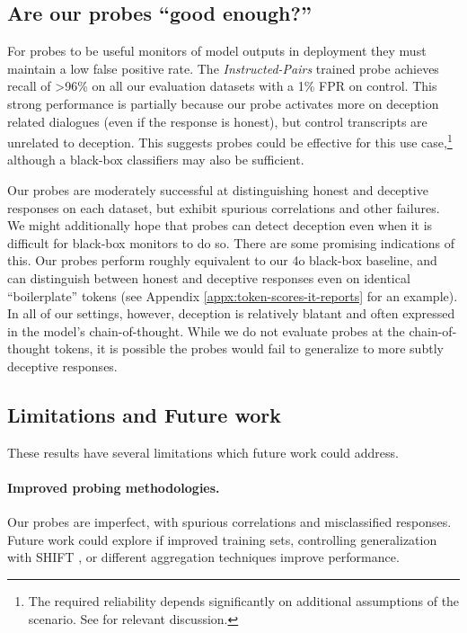 \documentclass{article}
\begin{document}
\subsection{Are our probes \enquote{good enough?}}\label{distinguishing-probe-use-cases}


For probes to be useful monitors of model outputs in deployment they must maintain a low false positive rate. The \textit{Instructed-Pairs} trained probe achieves recall of \textgreater96\%  on all our evaluation datasets with a 1\% FPR on control. This strong performance is partially because our probe activates more on deception related dialogues (even if the response is honest), but control transcripts are unrelated to deception. This suggests probes could be effective for this use case,\footnote{The required reliability depends significantly on additional assumptions of the scenario. See \citet{shlegeris2024_protocols} for relevant discussion.} although a black-box classifiers may also be sufficient.

Our probes are moderately successful at distinguishing honest and deceptive responses on each dataset, but exhibit spurious correlations and other failures.
We might additionally hope that probes can detect deception even when it is difficult for black-box monitors to do so. There are some promising indications of this. 
Our probes perform roughly equivalent to our 4o black-box baseline, and can distinguish between honest and deceptive responses even on identical \enquote{boilerplate} tokens (see Appendix \ref{appx:token-scores-it-reports} for an example). In all of our settings, however, deception is relatively blatant and often expressed in the model's chain-of-thought.
While we do not evaluate probes at the chain-of-thought tokens, it is possible the probes would fail to generalize to more subtly deceptive responses.




\subsection{Limitations and Future work}\label{limitations-and-future-work}

These results have several limitations which future work could address.

\paragraph{Improved probing methodologies.} Our
probes are imperfect, with spurious correlations and misclassified responses.
Future work could explore if improved training sets, controlling generalization with SHIFT \citep{Marks2024_sparse}, or different aggregation techniques improve performance.
\end{document}

